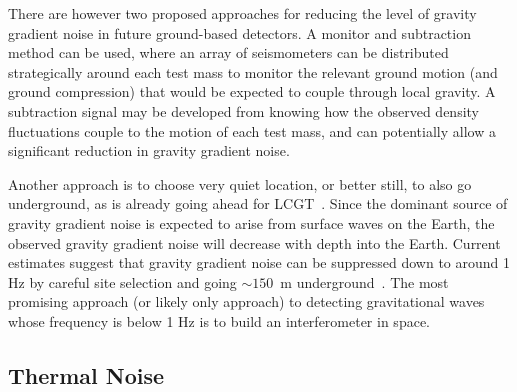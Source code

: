 \documentclass{article}
\begin{document}
There are however two proposed approaches for reducing the level of gravity
gradient noise in future ground-based detectors. A monitor and subtraction
method can be used, where an array of seismometers can be distributed
strategically around each test mass to monitor the relevant ground motion (and
ground compression) that would be expected to couple through local gravity.  A
subtraction signal may be developed from knowing how the observed density
fluctuations couple to the motion of each test mass, and can potentially allow a
significant reduction in gravity gradient noise.

Another approach is to choose very quiet location, or better still, to also go
underground, as is already going ahead for LCGT~\cite{Miyoki:2005}.  Since the
dominant source of gravity gradient noise is expected to arise from surface
waves on the Earth, the observed gravity gradient noise will decrease with depth
into the Earth.  Current estimates suggest that gravity gradient noise can be
suppressed down to around 1 Hz by careful site selection and going $\sim 150$~m
underground~\cite{Beker:2011}.  The most promising approach (or likely only
approach) to detecting gravitational waves whose frequency is below 1 Hz is to
build an interferometer in space.


\subsection{Thermal Noise}
\label{subsection:thermal}
\end{document}
